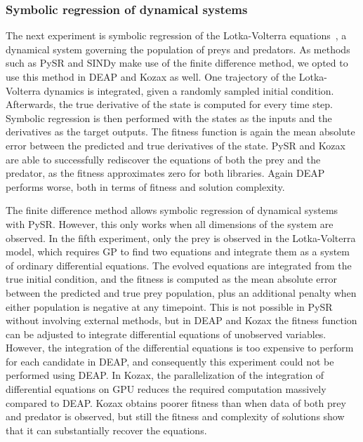 \documentclass{article}
\begin{document}
\subsubsection{Symbolic regression of dynamical systems}
The next experiment is symbolic regression of the Lotka-Volterra equations~\cite{goel1971volterra}, a dynamical system governing the population of preys and predators. As methods such as PySR and SINDy make use of the finite difference method, we opted to use this method in DEAP and Kozax as well. One trajectory of the Lotka-Volterra dynamics is integrated, given a randomly sampled initial condition. Afterwards, the true derivative of the state is computed for every time step. Symbolic regression is then performed with the states as the inputs and the derivatives as the target outputs. The fitness function is again the mean absolute error between the predicted and true derivatives of the state. PySR and Kozax are able to successfully rediscover the equations of both the prey and the predator, as the fitness approximates zero for both libraries. Again DEAP performs worse, both in terms of fitness and solution complexity.

The finite difference method allows symbolic regression of dynamical systems with PySR. However, this only works when all dimensions of the system are observed. In the fifth experiment, only the prey is observed in the Lotka-Volterra model, which requires GP to find two equations and integrate them as a system of ordinary differential equations. The evolved equations are integrated from the true initial condition, and the fitness is computed as the mean absolute error between the predicted and true prey population, plus an additional penalty when either population is negative at any timepoint. This is not possible in PySR without involving external methods, but in DEAP and Kozax the fitness function can be adjusted to integrate differential equations of unobserved variables. However, the integration of the differential equations is too expensive to perform for each candidate in DEAP, and consequently this experiment could not be performed using DEAP. In Kozax, the parallelization of the integration of differential equations on GPU reduces the required computation massively compared to DEAP. Kozax obtains poorer fitness than when data of both prey and predator is observed, but still the fitness and complexity of solutions show that it can substantially recover the equations.
\end{document}
